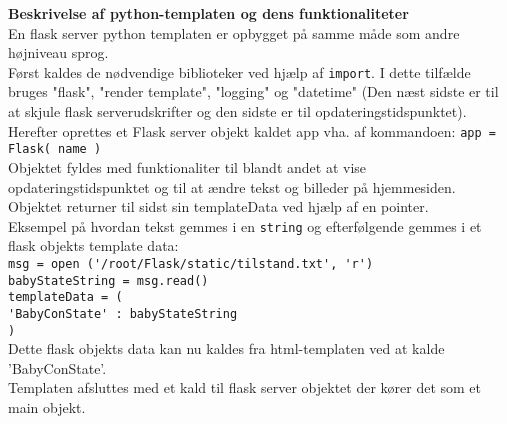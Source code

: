 \textbf{Beskrivelse af python-templaten og dens funktionaliteter}\\
En flask server python templaten er opbygget på samme måde som andre højniveau sprog. \\
Først kaldes de nødvendige biblioteker ved hjælp af \verb+import+. I dette tilfælde bruges "flask", "render template", "logging" og "datetime" (Den næst sidste er til at skjule flask serverudskrifter og den sidste er til opdateringstidspunktet). \\ Herefter oprettes et Flask server objekt kaldet app vha. af kommandoen: \verb+app = Flask( name )+ \\ Objektet fyldes med funktionaliter til blandt andet at vise opdateringstidspunktet og til at ændre tekst og billeder på hjemmesiden. Objektet returner til sidst sin templateData ved hjælp af en pointer. \\
Eksempel på hvordan tekst gemmes i en \verb+string+ og efterfølgende gemmes i et flask objekts template data: \\
 \verb+msg = open ('/root/Flask/static/tilstand.txt', 'r')+ \\
   \verb+babyStateString = msg.read()+ \\
   \verb+templateData = (+ \\
      \verb+'BabyConState' : babyStateString+\\
      \verb+)+ \\ Dette flask objekts data kan nu kaldes fra html-templaten ved at kalde 'BabyConState'. \\
Templaten afsluttes med et kald til flask server objektet der kører det som et main objekt. \\
\vspace{5mm}


